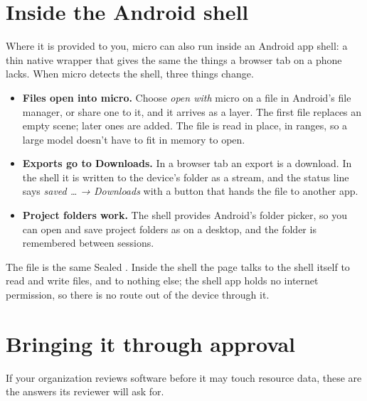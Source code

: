 \section{Inside the Android shell}\label{sec:sealed-android}
Where it is provided to you, micro can also run inside an Android app shell: a thin native wrapper that gives the same  the things a browser tab on a phone lacks. When micro detects the shell, three things change.

\begin{itemize}
\item \textbf{Files open into micro.} Choose \emph{open with} micro on a file in Android's file manager, or share one to it, and it arrives as a layer. The first file replaces an empty scene; later ones are added. The file is read in place, in ranges, so a large model doesn't have to fit in memory to open.
\item \textbf{Exports go to Downloads.} In a browser tab an export is a download. In the shell it is written to the device's  folder as a stream, and the status line says \emph{saved … → Downloads} with a  button that hands the file to another app.
\item \textbf{Project folders work.} The shell provides Android's folder picker, so you can open and save project folders as on a desktop, and the folder is remembered between sessions.
\end{itemize}

The file is the same Sealed . Inside the shell the page talks to the shell itself to read and write files, and to nothing else; the shell app holds no internet permission, so there is no route out of the device through it.

\section{Bringing it through approval}\label{sec:sealed-approval}
If your organization reviews software before it may touch resource data, these are the answers its reviewer will ask for.

